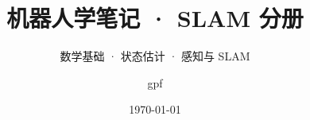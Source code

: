 
\usepackage{xr-hyper}

\title{机器人学笔记 · SLAM 分册}
\subtitle{数学基础 · 状态估计 · 感知与 SLAM}
\author{gpf}\date{\today}


\maketitle
\frontmatter
\tableofcontents
\mainmatter



\backmatter
\nocite{*}
\printbibliography[heading=bibintoc, title={参考文献}]


